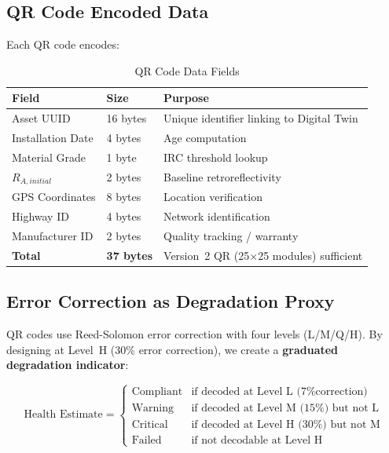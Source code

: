 \documentclass[11pt,a4paper]{article}
\begin{document}
\subsection{QR Code Encoded Data}

Each QR code encodes:

\begin{table}[H]
\centering
\caption{QR Code Data Fields}
\label{tab:qr_data}
\begin{tabular}{@{}lll@{}}
\toprule
\textbf{Field} & \textbf{Size} & \textbf{Purpose} \\
\midrule
Asset UUID & 16 bytes & Unique identifier linking to Digital Twin \\
Installation Date & 4 bytes & Age computation \\
Material Grade & 1 byte & IRC threshold lookup \\
$R_{A,initial}$ & 2 bytes & Baseline retroreflectivity \\
GPS Coordinates & 8 bytes & Location verification \\
Highway ID & 4 bytes & Network identification \\
Manufacturer ID & 2 bytes & Quality tracking / warranty \\
\midrule
\textbf{Total} & \textbf{37 bytes} & Version~2 QR (25$\times$25 modules) sufficient \\
\bottomrule
\end{tabular}
\end{table}

\subsection{Error Correction as Degradation Proxy}

QR codes use Reed-Solomon error correction with four levels (L/M/Q/H). By designing at Level~H (30\% error correction), we create a \textbf{graduated degradation indicator}:

\begin{equation}
\text{Health Estimate} = \begin{cases}
\text{Compliant} & \text{if decoded at Level L (7\% correction)} \\
\text{Warning} & \text{if decoded at Level M (15\%) but not L} \\
\text{Critical} & \text{if decoded at Level H (30\%) but not M} \\
\text{Failed} & \text{if not decodable at Level H}
\end{cases}
\label{eq:qr_health}
\end{equation}
\end{document}
